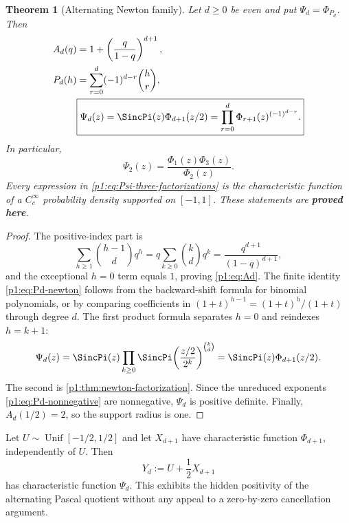 \documentclass[11pt,oneside]{article}
\numberwithin{equation}{section}
\newtheorem{theorem}{Theorem}[section]
\theoremstyle{definition}
\theoremstyle{remark}
\newcommand{\statusproved}{\textcolor{deepgreen}{\textbf{proved here}}}
\begin{document}
\begin{theorem}[Alternating Newton family]
\label{p1:thm:alternating-family}
Let $d\ge0$ be even and put $\Psi_d=\Phi_{P_d}$.  Then
\begin{align}
 A_d(q)
 &=1+\left(\frac q{1-q}\right)^{d+1},
 \label{p1:eq:Ad}\\
 P_d(h)
 &=\sum_{r=0}^{d}(-1)^{d-r}\binom hr,
 \label{p1:eq:Pd-newton}\\
 &\boxed{\Psi_d(z)
 =\SincPi(z)\Phi_{d+1}(z/2)
 =\prod_{r=0}^{d}\Phi_{r+1}(z)^{(-1)^{d-r}}.}
 \label{p1:eq:Psi-three-factorizations}
\end{align}
In particular,
\begin{equation}
 \boxed{\Psi_2(z)=\frac{\Phi_1(z)\Phi_3(z)}{\Phi_2(z)}.}
 \label{p1:eq:Psi2-quotient}
\end{equation}
Every expression in \eqref{p1:eq:Psi-three-factorizations} is the characteristic function of
a $C_c^\infty$ probability density supported on $[-1,1]$.  These statements are
\statusproved.
\end{theorem}

\begin{proof}
The positive-index part is
\[
 \sum_{h\ge1}\binom{h-1}{d}q^h
 =q\sum_{k\ge0}\binom kdq^k
 =\frac{q^{d+1}}{(1-q)^{d+1}},
\]
and the exceptional $h=0$ term equals $1$, proving \eqref{p1:eq:Ad}.  The finite identity
\eqref{p1:eq:Pd-newton} follows from the backward-shift formula for binomial polynomials, or by
comparing coefficients in
$(1+t)^{h-1}=(1+t)^h/(1+t)$ through degree $d$.
The first product formula separates $h=0$ and reindexes $h=k+1$:
\[
 \Psi_d(z)=\SincPi(z)
 \prod_{k\ge0}\SincPi\!\left(\frac{z/2}{2^k}\right)^{\binom kd}
 =\SincPi(z)\Phi_{d+1}(z/2).
\]
The second is \cref{p1:thm:newton-factorization}.  Since the unreduced exponents
\eqref{p1:eq:Pd-nonnegative} are nonnegative, $\Psi_d$ is positive definite.  Finally,
$A_d(1/2)=2$, so the support radius is one.
\end{proof}

\begin{corollary}
\label{p1:cor:Psi-random-model}
Let $U\sim\operatorname{Unif}[-1/2,1/2]$ and let $X_{d+1}$ have characteristic function
$\Phi_{d+1}$, independently of $U$.  Then
\begin{equation}
 Y_d:=U+\frac12X_{d+1}
 \label{p1:eq:Yd-random}
\end{equation}
has characteristic function $\Psi_d$.  This exhibits the hidden positivity of the
alternating Pascal quotient without any appeal to a zero-by-zero cancellation argument.
\end{corollary}
\end{document}
